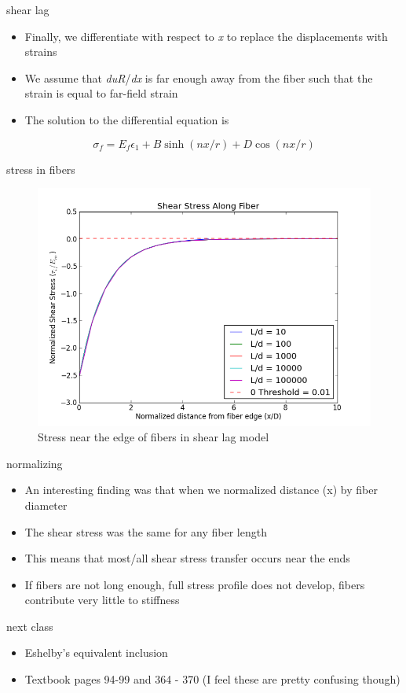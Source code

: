 \documentclass[
  letterpaper,
  ignorenonframetext,
  aspectratio=43,
  handout,
  12pt]{beamer}
\providecommand{\tightlist}{%
  \setlength{\itemsep}{0pt}\setlength{\parskip}{0pt}}
\providecommand{\tightlist}{%
\setlength{\itemsep}{0pt}\setlength{\parskip}{0pt}}
\let\Oldincludegraphics\includegraphics
\renewcommand{\includegraphics}[2][]{\Oldincludegraphics[width=\textwidth,height=0.7\textheight,keepaspectratio]{#2}}
\begin{document}
\begin{frame}{shear lag}
\protect\hypertarget{shear-lag-3}{}
\begin{itemize}
\tightlist
\item
  Finally, we differentiate with respect to \emph{x} to replace the
  displacements with strains
\item
  We assume that \emph{du}\emph{R}/\emph{dx} is far enough away from the
  fiber such that the strain is equal to far-field strain
\item
  The solution to the differential equation is
\end{itemize}

\[\sigma_f = E_f \epsilon_1 + B\sinh(nx/r) + D\cos(nx/r)\]
\end{frame}

\begin{frame}{stress in fibers}
\protect\hypertarget{stress-in-fibers}{}
\begin{figure}
\centering
\includegraphics{../images/shearlag.png}
\caption{Stress near the edge of fibers in shear lag model}
\end{figure}
\end{frame}

\begin{frame}{normalizing}
\protect\hypertarget{normalizing}{}
\begin{itemize}
\tightlist
\item
  An interesting finding was that when we normalized distance (x) by
  fiber diameter
\item
  The shear stress was the same for any fiber length
\item
  This means that most/all shear stress transfer occurs near the ends
\item
  If fibers are not long enough, full stress profile does not develop,
  fibers contribute very little to stiffness
\end{itemize}
\end{frame}

\begin{frame}{next class}
\protect\hypertarget{next-class}{}
\begin{itemize}
\tightlist
\item
  Eshelby's equivalent inclusion
\item
  Textbook pages 94-99 and 364 - 370 (I feel these are pretty confusing
  though)
\end{itemize}
\end{frame}
\end{document}
